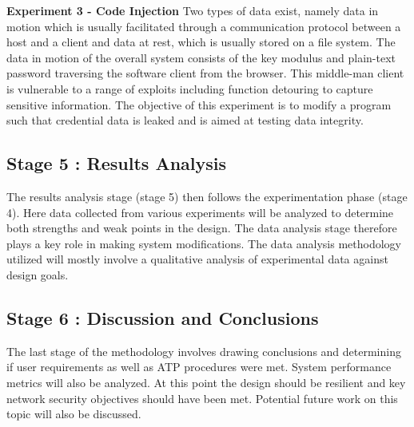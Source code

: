 \textbf{Experiment 3 - Code Injection}
Two types of data exist, namely data in motion which is usually facilitated through a communication protocol between a host and a client and data at rest, which is usually stored on a file system. The data in motion of the overall system consists of the key modulus and plain-text password traversing the software client from the browser. This middle-man client is vulnerable to a range of exploits including function detouring to capture sensitive information. The objective of this experiment is to modify a program such that credential data is leaked and is aimed at testing data integrity.

\subsection{Stage 5 : Results Analysis}
The results analysis stage (stage 5) then follows the experimentation phase (stage 4). Here data collected from various experiments will be analyzed to determine both strengths and weak points in the design. The data analysis stage therefore plays a key role in making system modifications. The data analysis methodology utilized will mostly involve a qualitative analysis of experimental data against design goals.

\subsection{Stage 6 : Discussion and Conclusions}
The last stage of the methodology involves drawing conclusions and determining if user requirements as well as ATP procedures were met. System performance metrics will also be analyzed. At this point the design should be resilient and key network security objectives should have been met. Potential future work on this topic will also be discussed.


